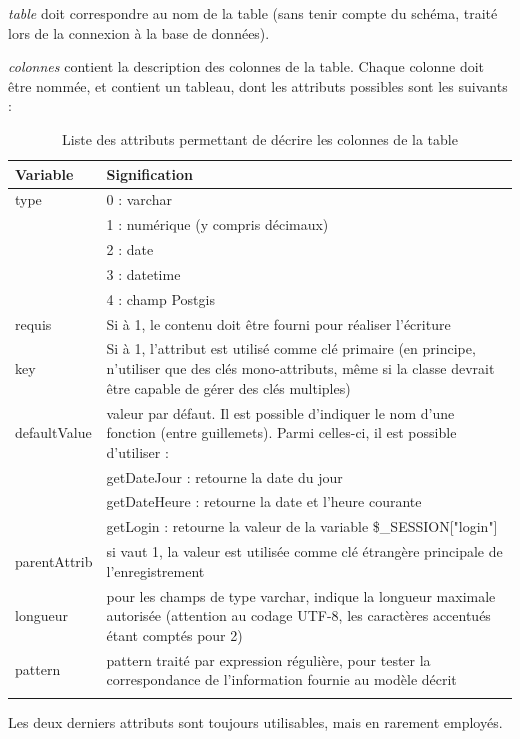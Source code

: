 \textit{table} doit correspondre au nom de la table (sans tenir compte du schéma, traité lors de la connexion à la base de données).

\textit{colonnes} contient la description des colonnes de la table. Chaque colonne doit être nommée, et contient un tableau, dont les  attributs possibles sont les suivants :

\begin{longtable}{|p{3cm}|p{10cm}|}
\hline
\textbf{Variable} & \textbf{Signification} \\
\hline
\endhead
type & 0 : varchar \\
& 1 : numérique (y compris décimaux) \\
& 2 : date \\
& 3 : datetime \\
& 4 : champ Postgis \\
\hline
requis & Si à 1, le contenu doit être fourni pour réaliser l'écriture \\
\hline
key & Si à 1, l'attribut est utilisé comme clé primaire (en principe, n'utiliser que des clés mono-attributs, même si la classe devrait être capable de gérer des clés multiples) \\
\hline
defaultValue & valeur par défaut. Il est possible d'indiquer le nom d'une fonction (entre guillemets). Parmi celles-ci, il est possible d'utiliser :\\
& getDateJour : retourne la date du jour \\
& getDateHeure : retourne la date et l'heure courante \\
& getLogin : retourne la valeur de la variable \$\_SESSION["login"]\\
\hline
parentAttrib & si vaut 1, la valeur est utilisée comme clé étrangère principale de l'enregistrement \\
\hline
longueur & pour les champs de type varchar, indique la longueur maximale autorisée (attention au codage UTF-8, les caractères accentués étant comptés pour 2) \\
\hline
pattern & pattern traité par expression régulière, pour tester la correspondance de l'information fournie au modèle décrit \\
\hline

\caption{Liste des attributs permettant de décrire les colonnes de la table\label{objetbdd-attr}}

\end{longtable}

Les deux derniers attributs sont toujours utilisables, mais en rarement employés.

